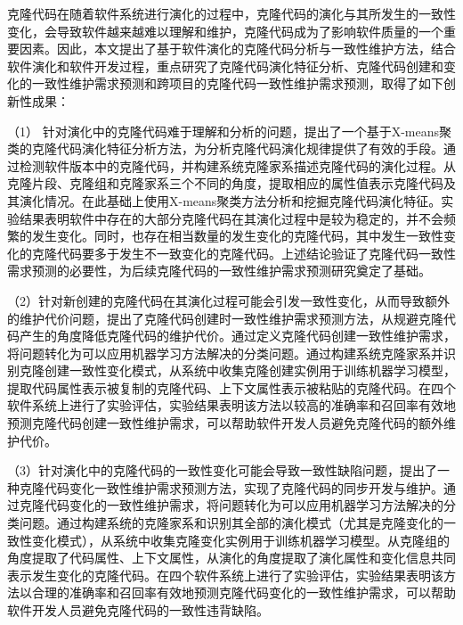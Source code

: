 

克隆代码在随着软件系统进行演化的过程中，克隆代码的演化与其所发生的一致性变化，会导致软件越来越难以理解和维护，克隆代码成为了影响软件质量的一个重要因素。因此，本文提出了基于软件演化的克隆代码分析与一致性维护方法，结合软件演化和软件开发过程，重点研究了克隆代码演化特征分析、克隆代码创建和变化的一致性维护需求预测和跨项目的克隆代码一致性维护需求预测，取得了如下创新性成果：

（1） 针对演化中的克隆代码难于理解和分析的问题，提出了一个基于X-means聚类的克隆代码演化特征分析方法，为分析克隆代码演化规律提供了有效的手段。通过检测软件版本中的克隆代码，并构建系统克隆家系描述克隆代码的演化过程。从克隆片段、克隆组和克隆家系三个不同的角度，提取相应的属性值表示克隆代码及其演化情况。在此基础上使用X-means聚类方法分析和挖掘克隆代码演化特征。实验结果表明软件中存在的大部分克隆代码在其演化过程中是较为稳定的，并不会频繁的发生变化。同时，也存在相当数量的发生变化的克隆代码，其中发生一致性变化的克隆代码要多于发生不一致变化的克隆代码。上述结论验证了克隆代码一致性需求预测的必要性，为后续克隆代码的一致性维护需求预测研究奠定了基础。

（2）针对新创建的克隆代码在其演化过程可能会引发一致性变化，从而导致额外的维护代价问题，提出了克隆代码创建时一致性维护需求预测方法，从规避克隆代码产生的角度降低克隆代码的维护代价。通过定义克隆代码创建一致性维护需求，将问题转化为可以应用机器学习方法解决的分类问题。通过构建系统克隆家系并识别克隆创建一致性变化模式，从系统中收集克隆创建实例用于训练机器学习模型，提取代码属性表示被复制的克隆代码、上下文属性表示被粘贴的克隆代码。在四个软件系统上进行了实验评估，实验结果表明该方法以较高的准确率和召回率有效地预测克隆代码创建一致性维护需求，可以帮助软件开发人员避免克隆代码的额外维护代价。

（3）针对演化中的克隆代码的一致性变化可能会导致一致性缺陷问题，提出了一种克隆代码变化一致性维护需求预测方法，实现了克隆代码的同步开发与维护。通过克隆代码变化的一致性维护需求，将问题转化为可以应用机器学习方法解决的分类问题。通过构建系统的克隆家系和识别其全部的演化模式（尤其是克隆变化的一致性变化模式），从系统中收集克隆变化实例用于训练机器学习模型。从克隆组的角度提取了代码属性、上下文属性，从演化的角度提取了演化属性和变化信息共同表示发生变化的克隆代码。在四个软件系统上进行了实验评估，实验结果表明该方法以合理的准确率和召回率有效地预测克隆代码变化的一致性维护需求，可以帮助软件开发人员避免克隆代码的一致性违背缺陷。

